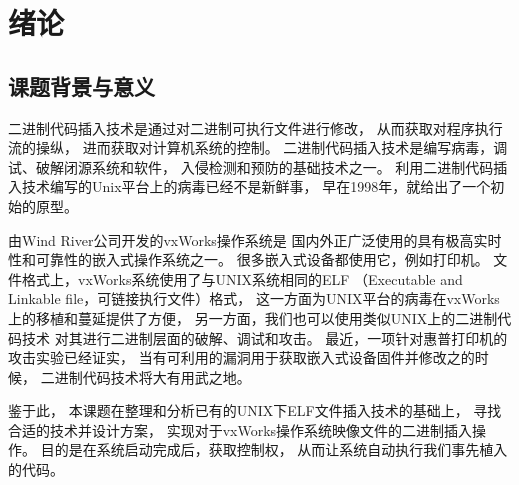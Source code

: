 \chapter{绪论}

%
%
%

\section{课题背景与意义}

二进制代码插入技术是通过对二进制可执行文件进行修改，
从而获取对程序执行流的操纵，
进而获取对计算机系统的控制。
二进制代码插入技术是编写病毒，调试、破解闭源系统和软件，
入侵检测和预防的基础技术之一。
利用二进制代码插入技术编写的Unix平台上的病毒已经不是新鲜事，
早在1998年，\cite{silvio}就给出了一个初始的原型。

由Wind River公司开发的vxWorks操作系统是
国内外正广泛使用的具有极高实时性和可靠性的嵌入式操作系统之一。
很多嵌入式设备都使用它，例如打印机。
文件格式上，vxWorks系统使用了与UNIX系统相同的ELF
（Executable and Linkable file，可链接执行文件）格式，
这一方面为UNIX平台的病毒在vxWorks上的移植和蔓延提供了方便，
另一方面，我们也可以使用类似UNIX上的二进制代码技术
对其进行二进制层面的破解、调试和攻击。
最近，一项针对惠普打印机的攻击实验已经证实，
当有可利用的漏洞用于获取嵌入式设备固件并修改之的时候，
二进制代码技术将大有用武之地。

鉴于此，
本课题在整理和分析已有的UNIX下ELF文件插入技术的基础上，
寻找合适的技术并设计方案，
实现对于vxWorks操作系统映像文件的二进制插入操作。
目的是在系统启动完成后，获取控制权，
从而让系统自动执行我们事先植入的代码。

